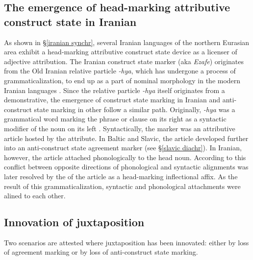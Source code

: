 {
\subsection[Head-marking attributive construct state]{The emergence of head-marking attributive construct state in Iranian}
\label{iranian diachr}
As shown in \S\ref{iranian synchr}, several Iranian languages of the northern Eurasian area exhibit a head-marking attributive construct state device as a licenser of adjective attribution. The Iranian construct state marker (aka \textit{Ezafe}) originates from the Old Iranian relative particle \textit{-hya}, which has undergone a process of grammaticalization, to end up as a part of nominal morphology in the modern Iranian languages \citep{haider-etal1984,samvelian2007b}. Since the  relative particle \textit{-hya} itself originates from a demonstrative, the emergence of construct state marking in Iranian and anti\hyp{}construct state marking in other  follow a similar path. Originally, \textit{-hya} was a grammatical word marking the phrase or clause on its right as a syntactic modifier of the noun on its left \citep{haider-etal1984}. Syntactically, the marker was an attributive article hosted by the attribute. In Baltic and Slavic, the article developed further into an anti\hyp{}construct state agreement marker (see \S\ref{slavic diachr}). In Iranian, however, the article attached phonologically to the head noun. According to \citet[3]{samvelian2007} this conflict between opposite directions of phonological and syntactic alignments was later resolved by the  of the article as a head-marking inflectional affix. As the result of this grammaticalization, syntactic and phonological attachments were alined to each other.

\subsection[Innovation of juxtaposition]{Innovation of juxtaposition}
Two scenarios are attested where juxtaposition has been innovated: either by loss of agreement marking or by loss of anti\hyp{}construct state marking.

}
